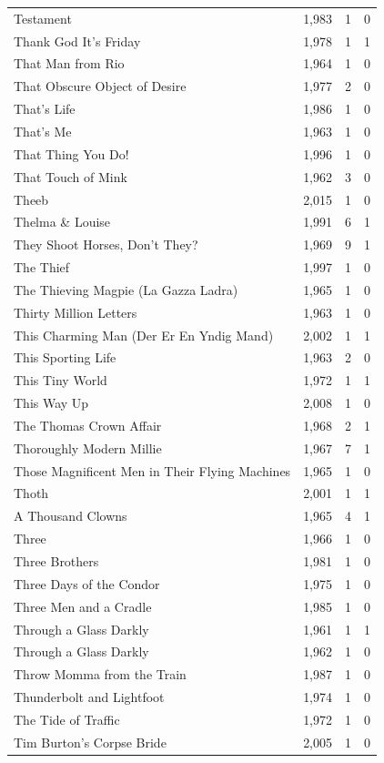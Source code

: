 \begin{tabular}{lrrr}
Testament & 1,983 & 1 & 0 \\
Thank God It's Friday & 1,978 & 1 & 1 \\
That Man from Rio & 1,964 & 1 & 0 \\
That Obscure Object of Desire & 1,977 & 2 & 0 \\
That's Life & 1,986 & 1 & 0 \\
That's Me & 1,963 & 1 & 0 \\
That Thing You Do! & 1,996 & 1 & 0 \\
That Touch of Mink & 1,962 & 3 & 0 \\
Theeb & 2,015 & 1 & 0 \\
Thelma \& Louise & 1,991 & 6 & 1 \\
They Shoot Horses, Don't They? & 1,969 & 9 & 1 \\
The Thief & 1,997 & 1 & 0 \\
The Thieving Magpie (La Gazza Ladra) & 1,965 & 1 & 0 \\
Thirty Million Letters & 1,963 & 1 & 0 \\
This Charming Man (Der Er En Yndig Mand) & 2,002 & 1 & 1 \\
This Sporting Life & 1,963 & 2 & 0 \\
This Tiny World & 1,972 & 1 & 1 \\
This Way Up & 2,008 & 1 & 0 \\
The Thomas Crown Affair & 1,968 & 2 & 1 \\
Thoroughly Modern Millie & 1,967 & 7 & 1 \\
Those Magnificent Men in Their Flying Machines & 1,965 & 1 & 0 \\
Thoth & 2,001 & 1 & 1 \\
A Thousand Clowns & 1,965 & 4 & 1 \\
Three & 1,966 & 1 & 0 \\
Three Brothers & 1,981 & 1 & 0 \\
Three Days of the Condor & 1,975 & 1 & 0 \\
Three Men and a Cradle & 1,985 & 1 & 0 \\
Through a Glass Darkly & 1,961 & 1 & 1 \\
Through a Glass Darkly & 1,962 & 1 & 0 \\
Throw Momma from the Train & 1,987 & 1 & 0 \\
Thunderbolt and Lightfoot & 1,974 & 1 & 0 \\
The Tide of Traffic & 1,972 & 1 & 0 \\
Tim Burton's Corpse Bride & 2,005 & 1 & 0 \\

\end{tabular}
